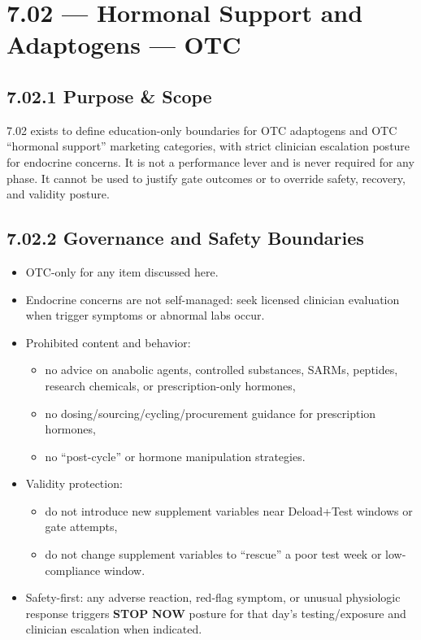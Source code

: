 \documentclass[10pt]{article}
\begin{document}
\section*{7.02 — Hormonal Support and Adaptogens — OTC}
{}

\subsection*{7.02.1 Purpose \& Scope}
{}

7.02 exists to define education-only boundaries for OTC adaptogens and OTC “hormonal support” marketing categories, with strict clinician escalation posture for endocrine concerns. It is not a performance lever and is never required for any phase. It cannot be used to justify gate outcomes or to override safety, recovery, and validity posture.

\subsection*{7.02.2 Governance and Safety Boundaries}
{}

\begin{itemize}
\item OTC-only for any item discussed here.
\item Endocrine concerns are not self-managed: seek licensed clinician evaluation when trigger symptoms or abnormal labs occur.
\item Prohibited content and behavior:
  \begin{itemize}
  \item no advice on anabolic agents, controlled substances, SARMs, peptides, research chemicals, or prescription-only hormones,
  \item no dosing/sourcing/cycling/procurement guidance for prescription hormones,
  \item no “post-cycle” or hormone manipulation strategies.
  \end{itemize}
\item Validity protection:
  \begin{itemize}
  \item do not introduce new supplement variables near Deload+Test windows or gate attempts,
  \item do not change supplement variables to “rescue” a poor test week or low-compliance window.
  \end{itemize}
\item Safety-first: any adverse reaction, red-flag symptom, or unusual physiologic response triggers \textbf{STOP} \textbf{NOW} posture for that day’s testing/exposure and clinician escalation when indicated.
\end{itemize}
\end{document}

